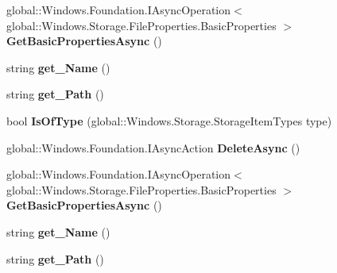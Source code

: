 \begin{DoxyCompactItemize}
\item 
\mbox{\label{interface_windows_1_1_storage_1_1_i_storage_item_a83642e3d152b180ace955ef374a5aad3}} 
global\+::\+Windows.\+Foundation.\+I\+Async\+Operation$<$ global\+::\+Windows.\+Storage.\+File\+Properties.\+Basic\+Properties $>$ {\bfseries Get\+Basic\+Properties\+Async} ()
\item 
\mbox{\label{interface_windows_1_1_storage_1_1_i_storage_item_a484400e7992b97add1f16fb9c1bee73a}} 
string {\bfseries get\+\_\+\+Name} ()
\item 
\mbox{\label{interface_windows_1_1_storage_1_1_i_storage_item_ae2665e5bf45bb4d62bf1434aa468f431}} 
string {\bfseries get\+\_\+\+Path} ()
\item 
\mbox{\label{interface_windows_1_1_storage_1_1_i_storage_item_a57853bba9d58c4b071bb217028afe56f}} 
bool {\bfseries Is\+Of\+Type} (global\+::\+Windows.\+Storage.\+Storage\+Item\+Types type)
\item 
\mbox{\label{interface_windows_1_1_storage_1_1_i_storage_item_a7268ae5d814924d40bb95256c8bc9e23}} 
global\+::\+Windows.\+Foundation.\+I\+Async\+Action {\bfseries Delete\+Async} ()
\item 
\mbox{\label{interface_windows_1_1_storage_1_1_i_storage_item_a83642e3d152b180ace955ef374a5aad3}} 
global\+::\+Windows.\+Foundation.\+I\+Async\+Operation$<$ global\+::\+Windows.\+Storage.\+File\+Properties.\+Basic\+Properties $>$ {\bfseries Get\+Basic\+Properties\+Async} ()
\item 
\mbox{\label{interface_windows_1_1_storage_1_1_i_storage_item_a484400e7992b97add1f16fb9c1bee73a}} 
string {\bfseries get\+\_\+\+Name} ()
\item 
\mbox{\label{interface_windows_1_1_storage_1_1_i_storage_item_ae2665e5bf45bb4d62bf1434aa468f431}} 
string {\bfseries get\+\_\+\+Path} ()

\end{DoxyCompactItemize}
